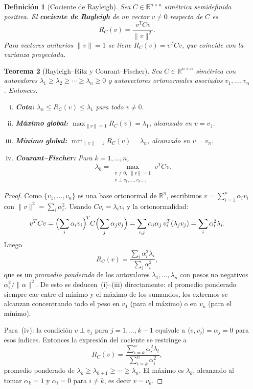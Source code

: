 \documentclass[12pt]{article}
\newtheorem{theorem}{Teorema}
\newtheorem{definition}[theorem]{Definición}
\newcommand{\R}{\mathbb{R}}
\begin{document}
\begin{definition}[Cociente de Rayleigh]
Sea $C \in \R^{n \times n}$ simétrica semidefinida positiva. El \textbf{cociente de Rayleigh} de un vector $v \neq 0$ respecto de $C$ es
\[
  R_C(v) = \frac{v^T C v}{\|v\|^2}.
\]
Para vectores unitarios $\|v\| = 1$ se tiene $R_C(v) = v^T C v$, que coincide con la varianza proyectada.
\end{definition}

\begin{theorem}[Rayleigh--Ritz y Courant--Fischer]
\label{thm:rayleigh}
Sea $C \in \R^{n \times n}$ simétrica con autovalores $\lambda_1 \geq \lambda_2 \geq \cdots \geq \lambda_n \geq 0$ y autovectores ortonormales asociados $v_1, \ldots, v_n$. Entonces:
\begin{enumerate}[(i)]
  \item \textbf{Cota:} $\lambda_n \leq R_C(v) \leq \lambda_1$ para todo $v \neq 0$.
  \item \textbf{Máximo global:} $\displaystyle\max_{\|v\|=1} R_C(v) = \lambda_1$, alcanzado en $v = v_1$.
  \item \textbf{Mínimo global:} $\displaystyle\min_{\|v\|=1} R_C(v) = \lambda_n$, alcanzado en $v = v_n$.
  \item \textbf{Courant--Fischer:} Para $k = 1, \ldots, n$,
  \[
    \lambda_k = \max_{\substack{v \neq 0,\; \|v\|=1 \\ v \perp v_1, \ldots, v_{k-1}}} v^T C v.
  \]
\end{enumerate}
\end{theorem}
\begin{proof}
Como $\{v_1, \ldots, v_n\}$ es una base ortonormal de $\R^n$, escribimos $v = \sum_{i=1}^n \alpha_i v_i$ con $\|v\|^2 = \sum_i \alpha_i^2$. Usando $Cv_i = \lambda_i v_i$ y la ortonormalidad:
\[
  v^T C v = \Bigl(\sum_i \alpha_i v_i\Bigr)^{\!T} C \Bigl(\sum_j \alpha_j v_j\Bigr)
           = \sum_{i,j} \alpha_i \alpha_j \, v_i^T (\lambda_j v_j)
           = \sum_i \alpha_i^2 \lambda_i.
\]
Luego
\[
  R_C(v) = \frac{\sum_i \alpha_i^2 \lambda_i}{\sum_i \alpha_i^2},
\]
que es un \emph{promedio ponderado} de los autovalores $\lambda_1, \ldots, \lambda_n$ con pesos no negativos $\alpha_i^2 / \|\alpha\|^2$. De esto se deducen~(i)--(iii) directamente: el promedio ponderado siempre cae entre el mínimo y el máximo de los sumandos, los extremos se alcanzan concentrando todo el peso en $v_1$ (para el máximo) o en $v_n$ (para el mínimo).

Para~(iv): la condición $v \perp v_j$ para $j = 1, \ldots, k-1$ equivale a $\langle v, v_j \rangle = \alpha_j = 0$ para esos índices. Entonces la expresión del cociente se restringe a
\[
  R_C(v) = \frac{\sum_{i=k}^n \alpha_i^2 \lambda_i}{\sum_{i=k}^n \alpha_i^2},
\]
promedio ponderado de $\lambda_k \geq \lambda_{k+1} \geq \cdots \geq \lambda_n$. El máximo es $\lambda_k$, alcanzado al tomar $\alpha_k = 1$ y $\alpha_i = 0$ para $i \neq k$, es decir $v = v_k$.
\end{proof}
\end{document}
